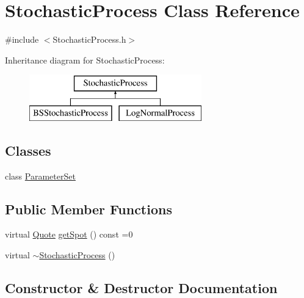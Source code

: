 \hypertarget{class_stochastic_process}{}\section{Stochastic\+Process Class Reference}
\label{class_stochastic_process}


{\ttfamily \#include $<$Stochastic\+Process.\+h$>$}

Inheritance diagram for Stochastic\+Process\+:\begin{figure}[H]
\begin{center}
\leavevmode
\includegraphics[height=2.000000cm]{class_stochastic_process}
\end{center}
\end{figure}
\subsection*{Classes}
\begin{DoxyCompactItemize}
\item 
class \hyperlink{class_stochastic_process_1_1_parameter_set}{Parameter\+Set}
\end{DoxyCompactItemize}
\subsection*{Public Member Functions}
\begin{DoxyCompactItemize}
\item 
virtual \hyperlink{_name_def_8h_a642a6c5fd87319d922637de0e0bb0305}{Quote} \hyperlink{class_stochastic_process_aad2ef51ca4bc2fe5f33a73e8f0ee361e}{get\+Spot} () const =0
\item 
virtual \hyperlink{class_stochastic_process_ac9c66520ce049a6ee61c079d2910e409}{$\sim$\+Stochastic\+Process} ()
\end{DoxyCompactItemize}


\subsection{Constructor \& Destructor Documentation}
\hypertarget{class_stochastic_process_ac9c66520ce049a6ee61c079d2910e409}{}\label{class_stochastic_process_ac9c66520ce049a6ee61c079d2910e409} 
